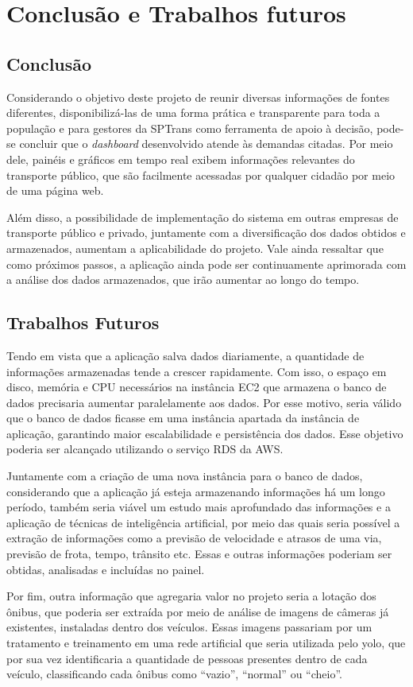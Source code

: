 \chapter{Conclusão e Trabalhos futuros}
\label{Cap:Conclusoes}

\section{Conclusão}
\indent
\par Considerando o objetivo deste projeto de reunir diversas informações de fontes diferentes, disponibilizá-las de uma forma prática e transparente para toda a população e para gestores da SPTrans como ferramenta de apoio à decisão, pode-se concluir que o \textit{dashboard} desenvolvido atende às demandas citadas. Por meio dele, painéis e gráficos em tempo real exibem informações relevantes do transporte público, que são facilmente acessadas por qualquer cidadão por meio de uma página web.
\indent
\par Além disso, a possibilidade de implementação do sistema em outras empresas de transporte público e privado, juntamente com a diversificação dos dados obtidos e armazenados, aumentam a aplicabilidade do projeto. Vale ainda ressaltar que como próximos passos, a aplicação ainda pode ser continuamente aprimorada com a análise dos dados armazenados, que irão aumentar ao longo do tempo.
\section{Trabalhos Futuros}
\indent
\par Tendo em vista que a aplicação salva dados diariamente, a quantidade de informações armazenadas tende a crescer rapidamente. Com isso, o espaço em disco, memória e CPU necessários na instância EC2 que armazena o banco de dados precisaria aumentar paralelamente aos dados. Por esse motivo, seria válido que o banco de dados ficasse em uma instância apartada da instância de aplicação, garantindo maior escalabilidade e persistência dos dados. Esse objetivo poderia ser alcançado utilizando o serviço RDS da AWS.
\indent
\par Juntamente com a criação de uma nova instância para o banco de dados, considerando que a aplicação já esteja armazenando informações há um longo período, também seria viável um estudo mais aprofundado das informações e a aplicação de técnicas de inteligência artificial, por meio das quais seria possível a extração de informações como a previsão de velocidade e atrasos de uma via, previsão de frota, tempo, trânsito etc. Essas e outras informações poderiam ser obtidas, analisadas e incluídas no painel.
\indent
\par Por fim, outra informação que agregaria valor no projeto seria a lotação dos ônibus, que poderia ser extraída por meio de análise de imagens de câmeras já existentes, instaladas dentro dos veículos. Essas imagens passariam por um tratamento e treinamento em uma rede artificial que seria utilizada pelo yolo, que por sua vez identificaria a quantidade de pessoas presentes dentro de cada veículo, classificando cada ônibus como “vazio”, “normal” ou “cheio”.




